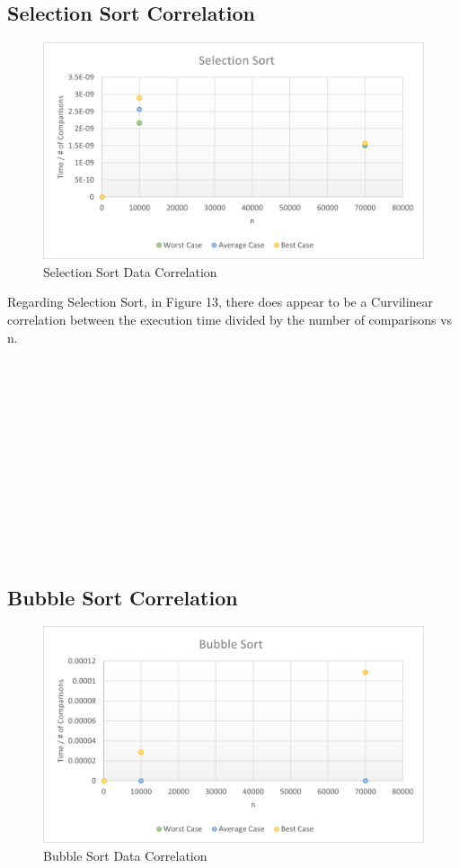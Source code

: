 \documentclass[12pt]{article}
\begin{document}
\subsection{Selection Sort Correlation} 
\begin{figure}[H]
	\centering
	\includegraphics[width=\textwidth]{Scorr.png}
\caption{Selection Sort Data Correlation}
    \label{fig:mesh1}
\end{figure}

	Regarding Selection Sort, in Figure 13, there does appear to be a Curvilinear correlation between the execution time divided by the number of comparisons vs n.\\
\\
\\
\\
\\
\\
\\
\\
\\
\\\\\\\\
\subsection{Bubble Sort Correlation} 
\begin{figure}[h]
	\centering
	\includegraphics[width=\textwidth]{Bcorr.png}
\caption{Bubble Sort Data Correlation}
    \label{fig:mesh1}
\end{figure}
\end{document}
